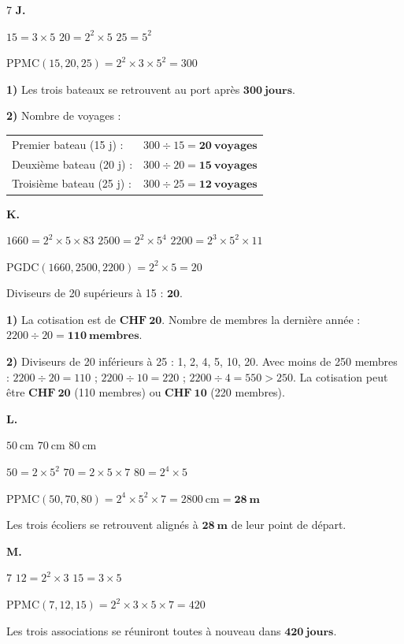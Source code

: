 \begin{solution}{7}
\bigskip
\textbf{J.}

$15 = 3 \times 5$ \quad $20 = 2^2 \times 5$ \quad $25 = 5^2$

$\text{PPMC}(15, 20, 25) = 2^2 \times 3 \times 5^2 = 300$

\textbf{1)} Les trois bateaux se retrouvent au port après $\mathbf{300\ jours}$.

\textbf{2)} Nombre de voyages :

\begin{tabular}{ll}
Premier bateau (15 j) :  & $300 \div 15 = \mathbf{20\ voyages}$ \\[4pt]
Deuxième bateau (20 j) : & $300 \div 20 = \mathbf{15\ voyages}$ \\[4pt]
Troisième bateau (25 j) :& $300 \div 25 = \mathbf{12\ voyages}$ \\[4pt]
\end{tabular}

\bigskip
\textbf{K.}

$1660 = 2^2 \times 5 \times 83$ \quad $2500 = 2^2 \times 5^4$ \quad $2200 = 2^3 \times 5^2 \times 11$

$\text{PGDC}(1660, 2500, 2200) = 2^2 \times 5 = 20$

Diviseurs de 20 supérieurs à 15 : $\mathbf{20}$.

\textbf{1)} La cotisation est de $\mathbf{CHF\ 20}$. Nombre de membres la dernière année : $2200 \div 20 = \mathbf{110\ membres}$.

\textbf{2)} Diviseurs de 20 inférieurs à 25 : 1, 2, 4, 5, 10, 20. Avec moins de 250 membres : $2200 \div 20 = 110$ ; $2200 \div 10 = 220$ ; $2200 \div 4 = 550 > 250$. La cotisation peut être $\mathbf{CHF\ 20}$ (110 membres) ou $\mathbf{CHF\ 10}$ (220 membres).

\bigskip
\textbf{L.}

$50\ \text{cm}$ \quad $70\ \text{cm}$ \quad $80\ \text{cm}$

$50 = 2 \times 5^2$ \quad $70 = 2 \times 5 \times 7$ \quad $80 = 2^4 \times 5$

$\text{PPMC}(50, 70, 80) = 2^4 \times 5^2 \times 7 = 2800\ \text{cm} = \mathbf{28\ m}$

Les trois écoliers se retrouvent alignés à $\mathbf{28\ m}$ de leur point de départ.

\bigskip
\textbf{M.}

$7$ \quad $12 = 2^2 \times 3$ \quad $15 = 3 \times 5$

$\text{PPMC}(7, 12, 15) = 2^2 \times 3 \times 5 \times 7 = 420$

Les trois associations se réuniront toutes à nouveau dans $\mathbf{420\ jours}$.

\end{solution}

